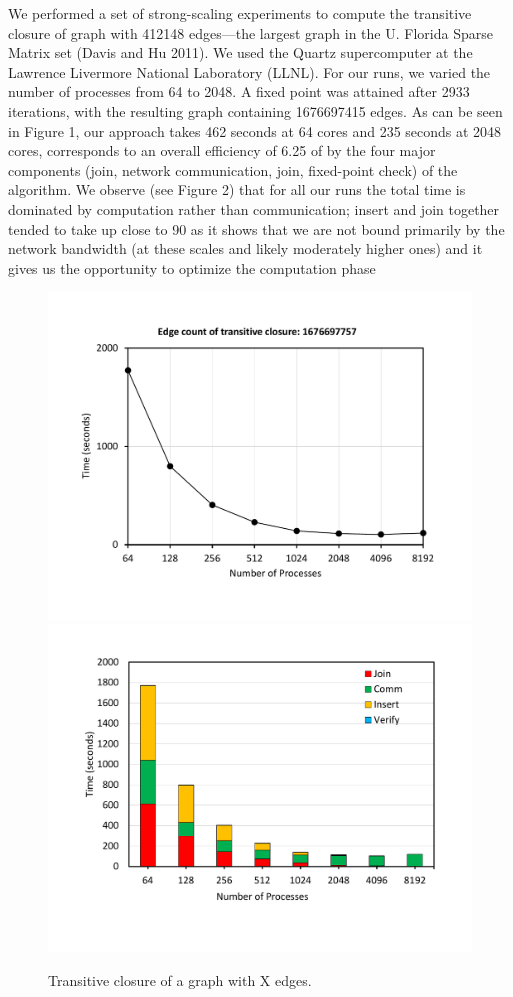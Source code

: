 We performed a set of strong-scaling experiments to compute the transitive closure of graph with 412148
edges—the largest graph in the U. Florida Sparse Matrix set (Davis and Hu 2011). We used the Quartz supercomputer
at the Lawrence Livermore National Laboratory (LLNL). For our runs, we varied the number of processes
from 64 to 2048. A fixed point was attained after 2933 iterations, with the resulting graph containing 1676697415
edges. As can be seen in Figure 1, our approach takes 462 seconds at 64 cores and 235 seconds at 2048 cores, corresponds
to an overall efficiency of 6.25%
of by the four major components (join, network communication, join, fixed-point check) of the algorithm. We
observe (see Figure 2) that for all our runs the total time is dominated by computation rather than communication;
insert and join together tended to take up close to 90%
as it shows that we are not bound primarily by the network bandwidth (at these scales and likely moderately
higher ones) and it gives us the opportunity to optimize the computation phase

\begin{figure}[t]
	{\includegraphics[width=.50\textwidth,  trim={0cm 0cm 0cm 0cm, 
			clip}]{results/TC_1_6Billion.pdf}}\hfill%
	{\includegraphics[width=.50\textwidth,  trim={0cm 0cm 0cm 0cm,
			clip}]{results/TC_1_6Billion_breakdown.pdf}}\hfill%
	\centering
	\caption{Transitive closure of a graph with X edges.}
	\label{fig:tc_small}
\end{figure}


